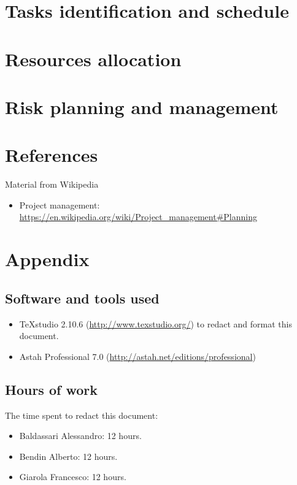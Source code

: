 \documentclass[a4paper,11pt]{report} %
\begin{document}
	\section{Tasks identification and schedule}	
	
	\section{Resources allocation}	
	
	\section{Risk planning and management}	

	\pagebreak
	\section{References}
		Material from Wikipedia
		\begin{itemize}
			\item Project management: \href{https://en.wikipedia.org/wiki/Project\_management\#Planning}{https://en.wikipedia.org/wiki/Project\_management\#Planning}
		\end{itemize}
	
	\section{Appendix}
		\subsection{Software and tools used}
		\begin{itemize}
			\item TeXstudio 2.10.6 (\href{http://www.texstudio.org/}{http://www.texstudio.org/}) to redact and format this document.
			\item Astah Professional 7.0 (\href{http://astah.net/editions/professional}{http://astah.net/editions/professional}) 
		\end{itemize}
		
		\subsection{Hours of work} The time spent to redact this document:
		\begin{itemize}
			\item Baldassari Alessandro: 12 hours.
			\item Bendin Alberto: 12 hours.
			\item Giarola Francesco: 12 hours.
		\end{itemize}
\end{document}
